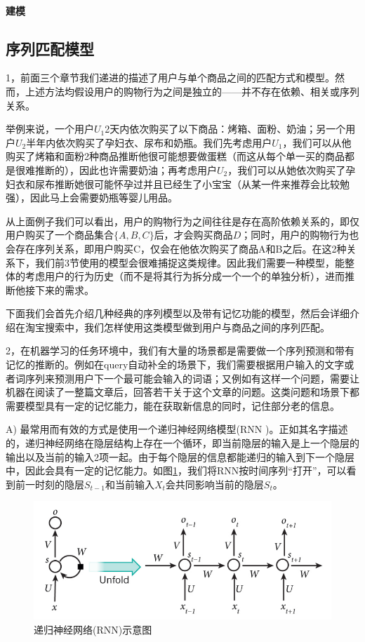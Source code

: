 	\paragraph{建模}
	
\subsection{序列匹配模型} 
1，前面三个章节我们递进的描述了用户与单个商品之间的匹配方式和模型。然而，上述方法均假设用户的购物行为之间是独立的——并不存在依赖、相关或序列关系。

举例来说，一个用户$U_1$2天内依次购买了以下商品：烤箱、面粉、奶油；另一个用户$U_2$半年内依次购买了孕妇衣、尿布和奶瓶。我们先考虑用户$U_1$，我们可以从他购买了烤箱和面粉2种商品推断他很可能想要做蛋糕（而这从每个单一买的商品都是很难推断的），因此也许需要奶油；再考虑用户$U_2$，我们可以从她依次购买了孕妇衣和尿布推断她很可能怀孕过并且已经生了小宝宝（从某一件来推荐会比较勉强），因此马上会需要奶瓶等婴儿用品。

从上面例子我们可以看出，用户的购物行为之间往往是存在高阶依赖关系的，即仅用户购买了一个商品集合$\{A, B, C\}$后，才会购买商品$D$；同时，用户的购物行为也会存在序列关系，即用户购买C，仅会在他依次购买了商品A和B之后。在这2种关系下，我们前3节使用的模型会很难捕捉这类规律。因此我们需要一种模型，能整体的考虑用户的行为历史（而不是将其行为拆分成一个一个的单独分析），进而推断他接下来的需求。

下面我们会首先介绍几种经典的序列模型以及带有记忆功能的模型，然后会详细介绍在淘宝搜索中，我们怎样使用这类模型做到用户与商品之间的序列匹配。

2，在机器学习的任务环境中，我们有大量的场景都是需要做一个序列预测和带有记忆的推断的。例如在query自动补全的场景下，我们需要根据用户输入的文字或者词序列来预测用户下一个最可能会输入的词语；又例如有这样一个问题，需要让机器在阅读了一整篇文章后，回答若干关于这个文章的问题。这类问题和场景下都需要模型具有一定的记忆能力，能在获取新信息的同时，记住部分老的信息。

A) 最常用而有效的方式是使用一个递归神经网络模型(RNN \cite{4,5})。正如其名字描述的，递归神经网络在隐层结构上存在一个循环，即当前隐层的输入是上一个隐层的输出以及当前的输入2项一起。由于每个隐层的信息都能递归的输入到下一个隐层中，因此会具有一定的记忆能力。如图\ref{fig:RNN}，我们将RNN按时间序列“打开”，可以看到前一时刻的隐层$S_{t-1}$和当前输入$X_t$会共同影响当前的隐层$S_{t}$。

\begin{figure}[h]
	\centering
	\includegraphics[width=0.8\linewidth]{"fig/RNN"}
	\caption{递归神经网络(RNN)示意图}
	\label{fig:RNN}
\end{figure}	

